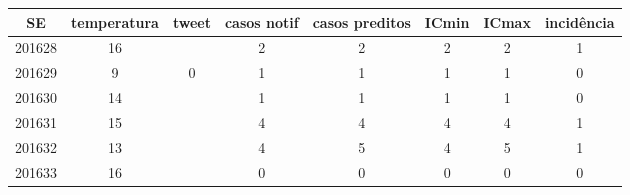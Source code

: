 \begin{tabular}{c|ccccccc}
  \hline
SE & temperatura & tweet & casos notif & casos preditos & ICmin & ICmax & incidência \\ 
  \hline
201628 & 16 &  & 2 & 2 & 2 & 2 & 1 \\ 
  201629 & 9 & 0 & 1 & 1 & 1 & 1 & 0 \\ 
  201630 & 14 &  & 1 & 1 & 1 & 1 & 0 \\ 
  201631 & 15 &  & 4 & 4 & 4 & 4 & 1 \\ 
  201632 & 13 &  & 4 & 5 & 4 & 5 & 1 \\ 
  201633 & 16 &  & 0 & 0 & 0 & 0 & 0 \\ 
   \hline
\end{tabular}
